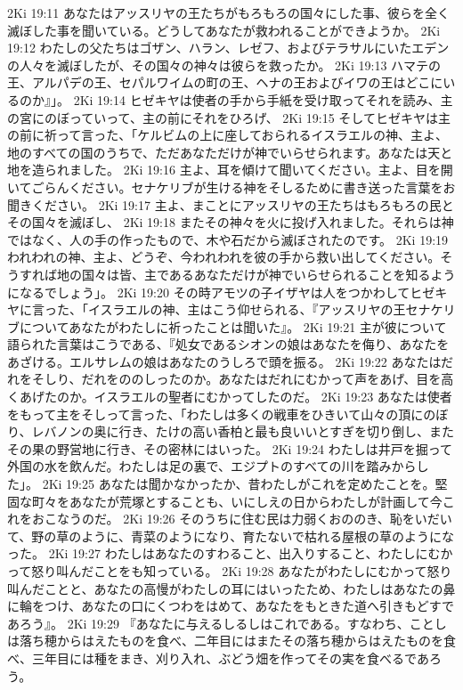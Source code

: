 2Ki 19:11  あなたはアッスリヤの王たちがもろもろの国々にした事、彼らを全く滅ぼした事を聞いている。どうしてあなたが救われることができようか。
2Ki 19:12  わたしの父たちはゴザン、ハラン、レゼフ、およびテラサルにいたエデンの人々を滅ぼしたが、その国々の神々は彼らを救ったか。
2Ki 19:13  ハマテの王、アルパデの王、セパルワイムの町の王、ヘナの王およびイワの王はどこにいるのか』」。
2Ki 19:14  ヒゼキヤは使者の手から手紙を受け取ってそれを読み、主の宮にのぼっていって、主の前にそれをひろげ、
2Ki 19:15  そしてヒゼキヤは主の前に祈って言った、「ケルビムの上に座しておられるイスラエルの神、主よ、地のすべての国のうちで、ただあなただけが神でいらせられます。あなたは天と地を造られました。
2Ki 19:16  主よ、耳を傾けて聞いてください。主よ、目を開いてごらんください。セナケリブが生ける神をそしるために書き送った言葉をお聞きください。
2Ki 19:17  主よ、まことにアッスリヤの王たちはもろもろの民とその国々を滅ぼし、
2Ki 19:18  またその神々を火に投げ入れました。それらは神ではなく、人の手の作ったもので、木や石だから滅ぼされたのです。
2Ki 19:19  われわれの神、主よ、どうぞ、今われわれを彼の手から救い出してください。そうすれば地の国々は皆、主であるあなただけが神でいらせられることを知るようになるでしょう」。
2Ki 19:20  その時アモツの子イザヤは人をつかわしてヒゼキヤに言った、「イスラエルの神、主はこう仰せられる、『アッスリヤの王セナケリブについてあなたがわたしに祈ったことは聞いた』。
2Ki 19:21  主が彼について語られた言葉はこうである、『処女であるシオンの娘はあなたを侮り、あなたをあざける。エルサレムの娘はあなたのうしろで頭を振る。
2Ki 19:22  あなたはだれをそしり、だれをののしったのか。あなたはだれにむかって声をあげ、目を高くあげたのか。イスラエルの聖者にむかってしたのだ。
2Ki 19:23  あなたは使者をもって主をそしって言った、「わたしは多くの戦車をひきいて山々の頂にのぼり、レバノンの奥に行き、たけの高い香柏と最も良いいとすぎを切り倒し、またその果の野営地に行き、その密林にはいった。
2Ki 19:24  わたしは井戸を掘って外国の水を飲んだ。わたしは足の裏で、エジプトのすべての川を踏みからした」。
2Ki 19:25  あなたは聞かなかったか、昔わたしがこれを定めたことを。堅固な町々をあなたが荒塚とすることも、いにしえの日からわたしが計画して今これをおこなうのだ。
2Ki 19:26  そのうちに住む民は力弱くおののき、恥をいだいて、野の草のように、青菜のようになり、育たないで枯れる屋根の草のようになった。
2Ki 19:27  わたしはあなたのすわること、出入りすること、わたしにむかって怒り叫んだことをも知っている。
2Ki 19:28  あなたがわたしにむかって怒り叫んだことと、あなたの高慢がわたしの耳にはいったため、わたしはあなたの鼻に輪をつけ、あなたの口にくつわをはめて、あなたをもときた道へ引きもどすであろう』。
2Ki 19:29  『あなたに与えるしるしはこれである。すなわち、ことしは落ち穂からはえたものを食べ、二年目にはまたその落ち穂からはえたものを食べ、三年目には種をまき、刈り入れ、ぶどう畑を作ってその実を食べるであろう。
